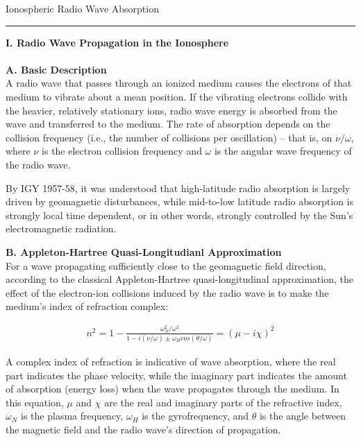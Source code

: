 


\huge{Ionospheric Radio Wave Absorption}
\rule{\textwidth}{1pt}
\normalsize


\textbf{I. Radio Wave Propagation in the Ionosphere} \\  
  \\  
  \textbf{A. Basic Description} \\  
    A radio wave that passes through an ionized medium causes the
    electrons of that medium to vibrate about a mean position.
    If the vibrating electrons collide with the heavier, relatively
    stationary ions, radio wave energy is absorbed from the wave and 
    transferred to the medium. The rate of absorption depends on the 
    collision frequency (i.e., the number of collisions per oscillation) 
    -- that is, on $\nu/\omega$, where $\nu$ is the electron collision 
    frequency and $\omega$ is the angular wave frequency of the radio 
    wave.

    By IGY 1957-58, it was understood that high-latitude radio
    absorption is largely driven by geomagnetic disturbances, while mid-to-low
    latitude radio absorption is strongly local time dependent, or in
    other words, strongly controlled by the Sun's electromagnetic
    radiation.

  \textbf{B. Appleton-Hartree Quasi-Longitudianl Approximation} \\  
    For a wave propagating sufficiently close to the geomagnetic field
    direction, according to the classical Appleton-Hartree
    quasi-longitudinal approximation, the effect of the electron-ion
    collisions induced by the radio wave is to make the medium's index of
    refraction complex:

    \begin{gather}
      n^{2}=1-\frac{\omega^{2}_{N}/\omega^{2}}
      {1-i(\nu/\omega)\pm\omega_{H}cos(\theta/\omega)}=(\mu-i\chi)^{2}
    \end{gather}

    
    A complex index of refraction is indicative of wave
    absorption, where the real part indicates the phase velocity, while the
    imaginary part indicates the amount of absorption (energy loss) when the
    wave propagates through the medium. In this equation, $\mu$ and $\chi$ are the real 
    and imaginary parts of the refractive index, $\omega_{N}$ is the plasma 
    frequency, $\omega_{H}$ is the gyrofrequency, and $\theta$ is the angle 
    between the magnetic field and the radio wave's direction of propagation. 

